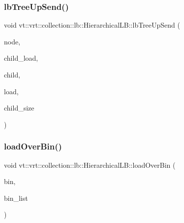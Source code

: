 \subsubsection{\texorpdfstring{lb\+Tree\+Up\+Send()}{lbTreeUpSend()}}
{\footnotesize\ttfamily void vt\+::vrt\+::collection\+::lb\+::\+Hierarchical\+L\+B\+::lb\+Tree\+Up\+Send (\begin{DoxyParamCaption}\item[{\hyperlink{namespacevt_a866da9d0efc19c0a1ce79e9e492f47e2}{Node\+Type} const}]{node,  }\item[{\hyperlink{namespacevt_a8fb51741340b87d7aaee0bef60e9896b}{Load\+Type} const}]{child\+\_\+load,  }\item[{\hyperlink{namespacevt_a866da9d0efc19c0a1ce79e9e492f47e2}{Node\+Type} const}]{child,  }\item[{\hyperlink{structvt_1_1vrt_1_1collection_1_1lb_1_1_load_sampler_base_l_b_a8d939a849ec0d6371c1c4d441ffb9b94}{Obj\+Sample\+Type} const \&}]{load,  }\item[{\hyperlink{namespacevt_a866da9d0efc19c0a1ce79e9e492f47e2}{Node\+Type} const}]{child\+\_\+size }\end{DoxyParamCaption})\hspace{0.3cm}{\ttfamily [private]}}

\mbox{\label{structvt_1_1vrt_1_1collection_1_1lb_1_1_hierarchical_l_b_a81e03ca1264d0b2cf9b0ee3eef7f792a}} 
\subsubsection{\texorpdfstring{load\+Over\+Bin()}{loadOverBin()}}
{\footnotesize\ttfamily void vt\+::vrt\+::collection\+::lb\+::\+Hierarchical\+L\+B\+::load\+Over\+Bin (\begin{DoxyParamCaption}\item[{\hyperlink{structvt_1_1vrt_1_1collection_1_1lb_1_1_load_sampler_base_l_b_acb55af31b27a3c248d351189abd78487}{Obj\+Bin\+Type}}]{bin,  }\item[{\hyperlink{structvt_1_1vrt_1_1collection_1_1lb_1_1_load_sampler_base_l_b_a58de8f1e1204cf52b661b3906e2d9eeb}{Obj\+Bin\+List\+Type} \&}]{bin\+\_\+list }\end{DoxyParamCaption})}

